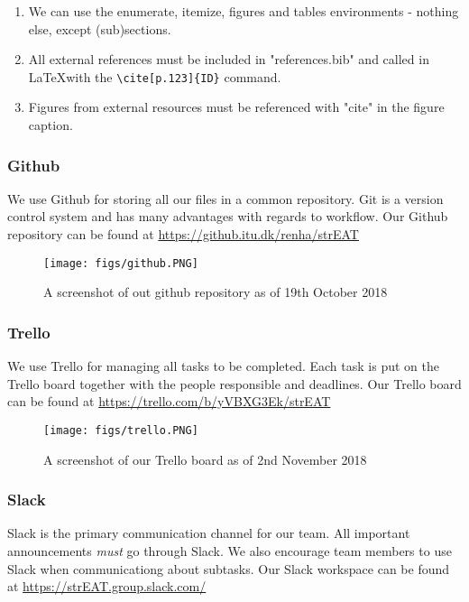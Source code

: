 \begin{enumerate}
    \item We can use the enumerate, itemize, figures and tables environments - nothing else, except (sub)sections.
    \item All external references must be included in "references.bib" and called in \LaTeX   with the \verb "\cite[p.123]{ID}" command.
    \item Figures from external resources must be referenced with "cite" in the figure caption.
\end{enumerate}


\subsubsection{ Github }

We use Github for storing all our files in a common repository. Git is a version control system and has many advantages with regards to workflow. Our Github repository can be found at \url{https://github.itu.dk/renha/strEAT}

\begin{figure}[h!]
  \centering
  \texttt{[image: figs/github.PNG]}
  \caption{A screenshot of out github repository as of 19th October 2018}
  \label{github}
\end{figure}




\subsubsection{ Trello }
We use Trello for managing all tasks to be completed. Each task is put on the Trello board together with the people responsible and deadlines. Our Trello board can be found at \url{https://trello.com/b/yVBXG3Ek/strEAT}

\begin{figure}[h!]
  \centering
  \texttt{[image: figs/trello.PNG]}
  \caption{A screenshot of our Trello board as of 2nd November 2018}
  \label{trello}
\end{figure}

\subsubsection{ Slack }
Slack is the primary communication channel for our team. All important announcements \emph{must} go through Slack. We also encourage team members to use Slack when communicationg about subtasks. Our Slack workspace can be found at \url{https://strEAT.group.slack.com/}

